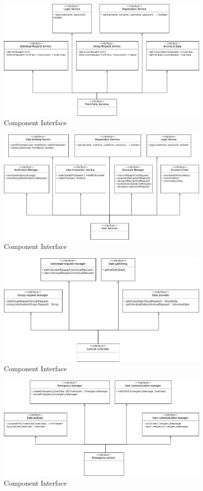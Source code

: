 \begin{figure}
    \centering
    \includegraphics[width=300pt]{images/CompInterfaces/Component_interfaces3.jpg}
    \caption{Component Interface}
\end{figure}

\begin{figure}
    \centering
    \includegraphics[width=300pt]{images/CompInterfaces/Component_interfaces4.jpg}
    \caption{Component Interface}
\end{figure}


\begin{figure}
    \centering
    \includegraphics[width=300pt]{images/CompInterfaces/Component_interfaces1.jpg}
    \caption{Component Interface}
\end{figure}

\begin{figure}
    \centering
    \includegraphics[width=300pt]{images/CompInterfaces/Component_interfaces2.jpg}
    \caption{Component Interface}
\end{figure}


